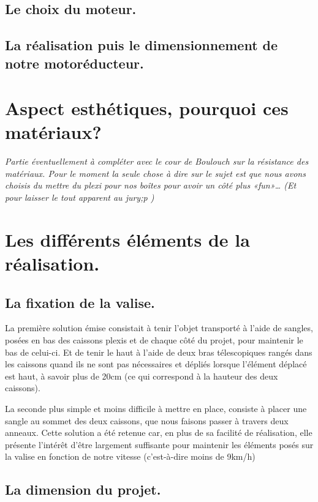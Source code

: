 \section{Le choix du moteur.}


\section{La réalisation puis le dimensionnement de notre motoréducteur.}



\chapter{Aspect esthétiques, pourquoi ces matériaux?}
\emph{Partie éventuellement à compléter avec le cour de Boulouch sur la résistance des matériaux. Pour le moment la seule chose à dire sur le sujet est que nous avons choisis du mettre du plexi pour nos boîtes pour avoir un côté plus «fun»… (Et pour laisser le tout apparent au jury;p )}

\chapter{Les différents éléments de la réalisation.}
\section{La fixation de la valise.}
La première solution émise consistait à tenir l’objet transporté à l’aide de sangles, posées en bas des caissons plexis et de chaque côté du projet, pour maintenir le bas de celui-ci. Et de tenir le haut à l’aide de deux bras télescopiques rangés dans les caissons quand ils ne sont pas nécessaires et dépliés lorsque l’élément déplacé est haut, à savoir plus de 20cm (ce qui correspond à la hauteur des deux caissons). 

La seconde plus simple et moins difficile à mettre en place, consiste à placer une sangle au sommet des deux caissons, que nous faisons passer à travers deux anneaux. Cette solution a été retenue car, en plus de sa facilité de réalisation, elle présente l’intérêt d’être largement suffisante pour maintenir les éléments posés sur la valise en fonction de notre vitesse (c’est-à-dire moins de 9km/h)

\section{La dimension du projet.}
